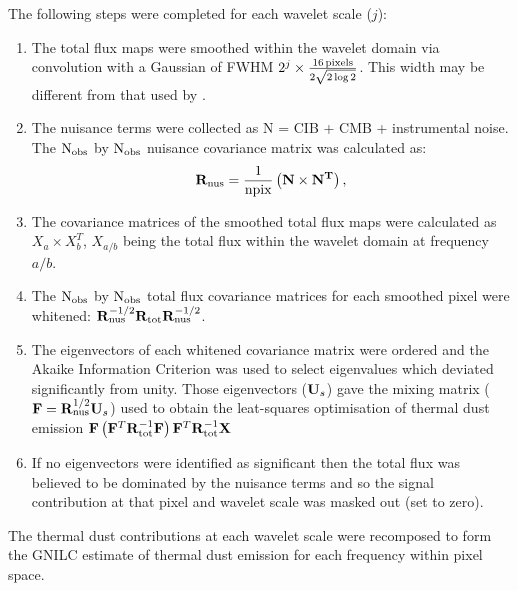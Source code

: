 \documentclass[a4paper,fleqn,usenatbib]{mnras}
\begin{document}
The following steps were completed for each wavelet scale ($j$):
\begin{enumerate}[label*=\arabic*.]
 \item The total flux maps were smoothed within the wavelet domain via convolution with a Gaussian of FWHM $2^{j} \times \frac{16\, \rm{pixels}}{2 \sqrt{2 \log{2}}}$. This width may be different from that used by \citet{gnilc}.  
 \item The nuisance terms were collected as N = CIB + CMB + instrumental noise. The $\rm{N_{obs}}$ by $\rm{N_{obs}}$ nuisance covariance matrix was calculated as:
\begin{equation}
{\bf{R}}_{{\rm{nus}}} = \frac{1}{\rm{npix}} \left({\bf{N \times N^{T} }} \right),  
\end{equation}     
 \item The covariance matrices of the smoothed total flux maps were calculated as $X_{a} \times X_{b}^{T} $, $X_{a/b}$ being the total flux within the wavelet domain at frequency $a/b$.
\item The $\rm{N_{obs}}$ by $\rm{N_{obs}}$ total flux covariance matrices for each smoothed pixel were whitened: ${\bf{R}}_{{\rm{nus}}}^{-1/2} {\bf{R}}_{{\rm{tot}}} {\bf{R}}_{{\rm{nus}}}^{-1/2}$.
\item The eigenvectors of each whitened covariance matrix were ordered and the Akaike Information Criterion was used to select eigenvalues which deviated significantly from unity. Those eigenvectors (${\bf{U}}_{s}$) gave the mixing matrix (${\bf{F}} = {\bf{R}}_{{\rm{nus}}}^{1/2} {\bf{U}}_{s} $) used to obtain the leat-squares optimisation of thermal dust emission ${\bf{F}} \left( {\bf{F}}^{T} {\bf{R}}_{{\rm{tot}}}^{-1} {\bf{F}} \right) {\bf{F}}^{T} {\bf{R}}_{{\rm{tot}}}^{-1} {\bf{X}}$ 
\item If no eigenvectors were identified as significant then the total flux was believed to be dominated by the nuisance terms and so the signal contribution at that pixel and wavelet scale was masked out (set to zero). 
\end{enumerate}
The thermal dust contributions at each wavelet scale were recomposed to form the GNILC estimate of thermal dust emission for each frequency within pixel space. 



\bsp	%
\label{lastpage}
\end{document}
